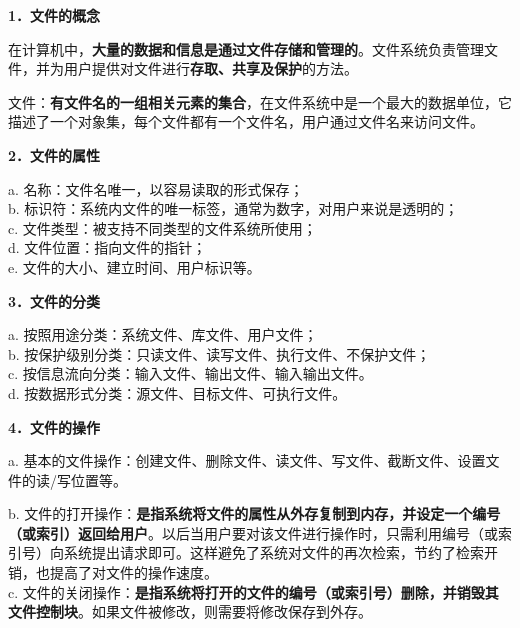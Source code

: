 \textbf{{1．文件的概念}}

{在计算机中，}\textbf{大量的数据和信息是通过文件存储和管理的}{。文件系统负责管理文件，并为用户提供对文件进行}\textbf{存取、共享及保护}{的方法。}

文件：\textbf{有文件名的一组相关元素的集合}，在文件系统中是一个最大的数据单位，它描述了一个对象集，每个文件都有一个文件名，用户通过文件名来访问文件。

\textbf{{2．文件的属性}}

{{a. 名称：文件名唯一，以容易读取的形式保存；}\\
{b. 标识符：系统内文件的唯一标签，通常为数字，对用户来说是透明的；}\\
{c. 文件类型：被支持不同类型的文件系统所使用；}\\
{d. 文件位置：指向文件的指针；}\\
{e. 文件的大小、建立时间、用户标识等。}}

\textbf{{3．文件的分类}}

a. 按照用途分类：系统文件、库文件、用户文件；\\
b. 按保护级别分类：只读文件、读写文件、执行文件、不保护文件；\\
c. 按信息流向分类：输入文件、输出文件、输入输出文件。\\
d. 按数据形式分类：源文件、目标文件、可执行文件。

\textbf{{4．文件的操作}}

a.
基本的文件操作：创建文件、删除文件、读文件、写文件、截断文件、设置文件的读/写位置等。

b.
文件的打开操作：{\textbf{是指系统将文件的属性从外存复制到内存，并设定一个编号（或索引）返回给用户}。以后当用户要对该文件进行操作时，只需利用编号（或索引号）向系统提出请求即可。这样避免了系统对文件的再次检索，节约了检索开销，也提高了对文件的操作速度。}\\
c.
文件的关闭操作：\textbf{是指系统将打开的文件的编号（或索引号）删除，{并销毁其文件控制块}}。如果文件被修改，则需要将修改保存到外存。
